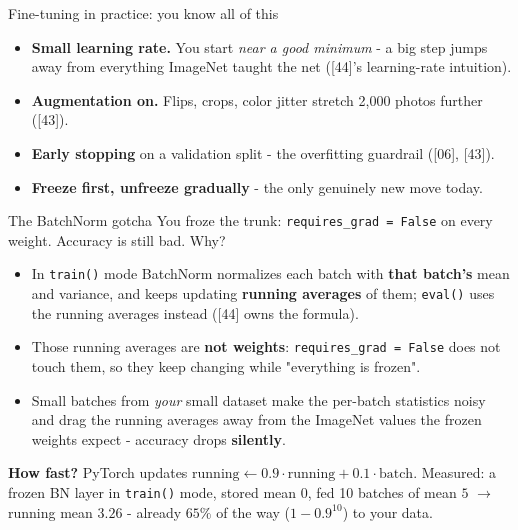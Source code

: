 \documentclass[aspectratio=169]{beamer}
\begin{document}
\begin{frame}{Fine-tuning in practice: you know all of this}
  \begin{itemize}
    \item \textbf{Small learning rate.} You start \emph{near a good minimum} - a big step
      jumps away from everything ImageNet taught the net ([44]'s learning-rate
      intuition).
    \item \textbf{Augmentation on.} Flips, crops, color jitter stretch 2,000 photos
      further ([43]).
    \item \textbf{Early stopping} on a validation split - the overfitting guardrail
      ([06], [43]).
    \item \textbf{Freeze first, unfreeze gradually} - the only genuinely new move today.
  \end{itemize}
  \vskip 8pt
\end{frame}

\begin{frame}{The BatchNorm gotcha}
  You froze the trunk: \texttt{requires\_grad = False} on every weight. Accuracy is
  still bad. Why?
  \vskip 6pt
  \begin{itemize}\small
    \item In \texttt{train()} mode BatchNorm normalizes each batch with \textbf{that
      batch's} mean and variance, and keeps updating \textbf{running averages} of them;
      \texttt{eval()} uses the running averages instead ([44] owns the formula).
    \item Those running averages are \textbf{not weights}: \texttt{requires\_grad =
      False} does not touch them, so they keep changing while "everything is frozen".
    \item Small batches from \emph{your} small dataset make the per-batch statistics noisy
      and drag the running averages away from the ImageNet values the frozen weights
      expect - accuracy drops \textbf{silently}.
  \end{itemize}
  \vskip 2pt
  {\small \textbf{How fast?} PyTorch updates
  $\text{running} \leftarrow 0.9\cdot\text{running} + 0.1\cdot\text{batch}$. Measured: a
  frozen BN layer in \texttt{train()} mode, stored mean $0$, fed 10 batches of mean $5$
  $\to$ running mean $3.26$ - already $65\%$ of the way ($1-0.9^{10}$) to your data.}
  \vskip 8pt
\end{frame}
\end{document}
